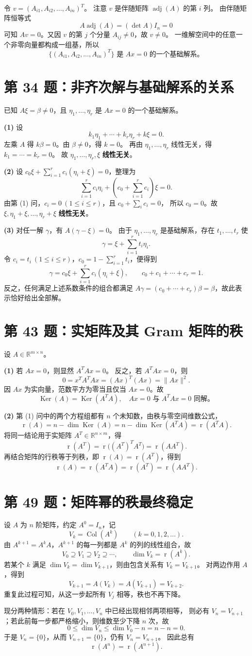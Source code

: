 \documentclass[11pt,a4paper,fontset=fandol]{ctexart}
\newcommand{\problem}[1]{\Needspace{6\baselineskip}\section*{#1}}
\newcommand{\ans}[1]{\boxed{#1}}
\newcommand{\rank}{\operatorname{r}}
\newcommand{\Null}{\operatorname{Ker}}
\newcommand{\Col}{\operatorname{Col}}
\newcommand{\R}{\mathbb R}
\begin{document}
令 $v=(A_{i1},A_{i2},\ldots,A_{in})^T$。
注意 $v$ 是伴随矩阵 $\operatorname{adj}(A)$ 的第 $i$ 列。
由伴随矩阵恒等式
\[
A\operatorname{adj}(A)=(\det A)I_n=0
\]
可知 $Av=0$。又因 $v$ 的第 $j$ 个分量 $A_{ij}\ne0$，故 $v\ne0$。
一维解空间中的任意一个非零向量都构成一组基，所以
\[
\ans{\bigl\{(A_{i1},A_{i2},\ldots,A_{in})^T\bigr\}
\text{ 是 }Ax=0\text{ 的一个基础解系。}}
\]

\problem{第 34 题：非齐次解与基础解系的关系}
已知 $A\xi=\beta\ne0$，且 $\eta_1,\ldots,\eta_r$ 是 $Ax=0$ 的一个基础解系。

\textbf{(1)} 设
\[
k_1\eta_1+\cdots+k_r\eta_r+k\xi=0.
\]
左乘 $A$ 得 $k\beta=0$。由 $\beta\ne0$，得 $k=0$。
再由 $\eta_1,\ldots,\eta_r$ 线性无关，得 $k_1=\cdots=k_r=0$。
故 $\eta_1,\ldots,\eta_r,\xi$ \textbf{线性无关}。

\textbf{(2)} 设 $c_0\xi+\sum_{i=1}^r c_i(\eta_i+\xi)=0$，整理为
\[
\sum_{i=1}^r c_i\eta_i+\left(c_0+\sum_{i=1}^r c_i\right)\xi=0.
\]
由第 (1) 问，$c_i=0\ (1\le i\le r)$，且 $c_0+\sum_i c_i=0$，
所以 $c_0=0$。故 $\xi,\eta_1+\xi,\ldots,\eta_r+\xi$ \textbf{线性无关}。

\textbf{(3)} 对任一解 $\gamma$，有 $A(\gamma-\xi)=0$。
由于 $\eta_1,\ldots,\eta_r$ 是基础解系，存在 $t_1,\ldots,t_r$ 使
\[
\gamma=\xi+\sum_{i=1}^r t_i\eta_i.
\]
令 $c_i=t_i\ (1\le i\le r)$，$c_0=1-\sum_{i=1}^r t_i$，便得到
\[
\ans{\gamma=c_0\xi+\sum_{i=1}^r c_i(\eta_i+\xi),\qquad
c_0+c_1+\cdots+c_r=1.}
\]
反之，任何满足上述系数条件的组合都满足
$A\gamma=(c_0+\cdots+c_r)\beta=\beta$，故此表示恰好给出全部解。

\newpage
\problem{第 43 题：实矩阵及其 Gram 矩阵的秩}
设 $A\in\R^{m\times n}$。

\textbf{(1)} 若 $Ax=0$，则显然 $A^TAx=0$。
反之，若 $A^TAx=0$，则
\[
0=x^TA^TAx=(Ax)^T(Ax)=\lVert Ax\rVert^2.
\]
因 $Ax$ 为实向量，范数平方为零当且仅当 $Ax=0$。故
\[
\ans{\Null(A)=\Null(A^TA),\quad
Ax=0\text{ 与 }A^TAx=0\text{ 同解。}}
\]

\textbf{(2)} 第 (1) 问中的两个方程组都有 $n$ 个未知数，由秩与零空间维数公式，
\[
\rank(A)=n-\dim\Null(A)
=n-\dim\Null(A^TA)=\rank(A^TA).
\]
将同一结论用于实矩阵 $A^T\in\R^{n\times m}$，得
\[
\rank(A^T)=\rank\bigl((A^T)^TA^T\bigr)=\rank(AA^T).
\]
再结合矩阵的行秩等于列秩，即 $\rank(A)=\rank(A^T)$，得到
\[
\ans{\rank(A)=\rank(A^TA)=\rank(A^T)=\rank(AA^T).}
\]

\problem{第 49 题：矩阵幂的秩最终稳定}
设 $A$ 为 $n$ 阶矩阵，约定 $A^0=I_n$，记
\[
V_k=\Col(A^k)\qquad(k=0,1,2,\ldots).
\]
由 $A^{k+1}=A^kA$，$A^{k+1}$ 的每一列都是 $A^k$ 的列的线性组合，故
\[
V_0\supseteq V_1\supseteq V_2\supseteq\cdots,
\qquad \dim V_k=\rank(A^k).
\]
若某个 $k$ 满足 $\dim V_k=\dim V_{k+1}$，则由包含关系有 $V_k=V_{k+1}$。
对两边作用 $A$，得到
\[
V_{k+1}=A(V_k)=A(V_{k+1})=V_{k+2}.
\]
重复此过程可知，从这一步起所有 $V_j$ 相等，秩也不再下降。

现分两种情形：若在 $V_0,V_1,\ldots,V_n$ 中已经出现相邻两项相等，
则必有 $V_n=V_{n+1}$；若此前每一步都严格缩小，则维数至少下降 $n$ 次，故
\[
0\le\dim V_n\le\dim V_0-n=n-n=0.
\]
于是 $V_n=\{0\}$，从而 $V_{n+1}=\{0\}$，仍有 $V_n=V_{n+1}$。
因此总有
\[
\ans{\rank(A^n)=\rank(A^{n+1}).}
\]
\end{document}
